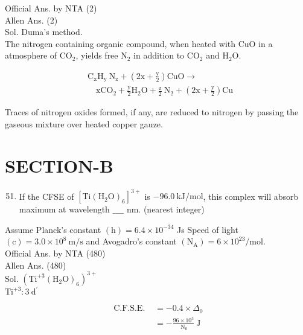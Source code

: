 \documentclass[10pt]{article}
\begin{document}
Official Ans. by NTA (2)\\
Allen Ans. (2)\\
Sol. Duma's method.\\
The nitrogen containing organic compound, when heated with CuO in a atmosphere of \(\mathrm{CO}_{2}\), yields free \(\mathrm{N}_{2}\) in addition to \(\mathrm{CO}_{2}\) and \(\mathrm{H}_{2} \mathrm{O}\).

\[
\begin{aligned}
& \mathrm{C}_{\mathrm{x}} \mathrm{H}_{\mathrm{y}} \mathrm{~N}_{\mathrm{z}}+\left(2 \mathrm{x}+\frac{\mathrm{y}}{2}\right) \mathrm{CuO} \rightarrow \\
& \quad \mathrm{x} \mathrm{CO}_{2}+\frac{\mathrm{y}}{2} \mathrm{H}_{2} \mathrm{O}+\frac{\mathrm{z}}{2} \mathrm{~N}_{2}+\left(2 \mathrm{x}+\frac{\mathrm{y}}{2}\right) \mathrm{Cu}
\end{aligned}
\]

Traces of nitrogen oxides formed, if any, are reduced to nitrogen by passing the gaseous mixture over heated copper gauze.

\section*{SECTION-B}
\begin{enumerate}
  \setcounter{enumi}{50}
  \item If the CFSE of \(\left[\mathrm{Ti}\left(\mathrm{H}_{2} \mathrm{O}\right)_{6}\right]^{3+}\) is \(-96.0 \mathrm{~kJ} / \mathrm{mol}\), this complex will absorb maximum at wavelength \(\_\_\_\_\) nm. (nearest integer)
\end{enumerate}

Assume Planck's constant \((\mathrm{h})=6.4 \times 10^{-34}\) Js Speed of light \((\mathrm{c})=3.0 \times 10^{8} \mathrm{~m} / \mathrm{s}\) and Avogadro's constant \(\left(\mathrm{N}_{\mathrm{A}}\right)=6 \times 10^{23} / \mathrm{mol}\).\\
Official Ans. by NTA (480)\\
Allen Ans. (480)\\
Sol. \(\left(\mathrm{Ti}^{+3}\left(\mathrm{H}_{2} \mathrm{O}\right)_{6}\right)^{3+}\)\\
\(\mathrm{Ti}^{+3}: 3 \mathrm{~d}^{\prime}\)

\[
\begin{aligned}
\text { C.F.S.E. } & =-0.4 \times \Delta_{0} \\
& =-\frac{96 \times 10^{3}}{\mathrm{~N}_{0}} \mathrm{~J}
\end{aligned}
\]
\end{document}
